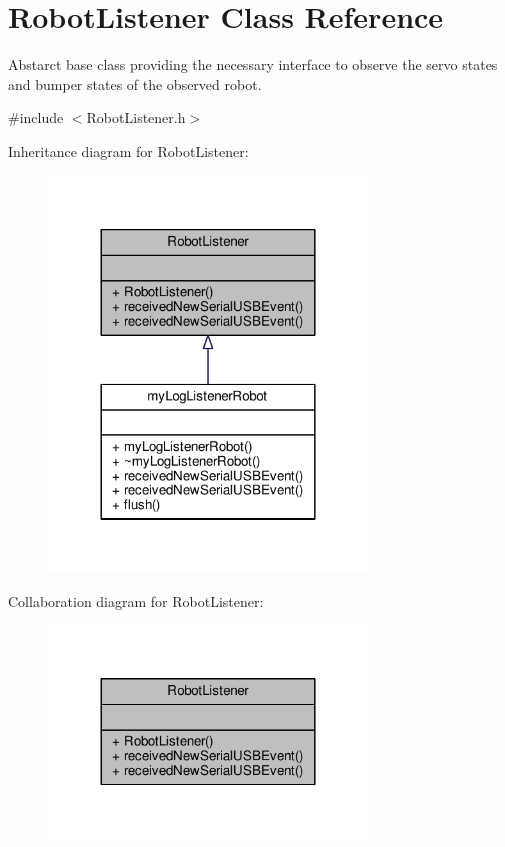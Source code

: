 \hypertarget{class_robot_listener}{}\section{Robot\+Listener Class Reference}
\label{class_robot_listener}


Abstarct base class providing the necessary interface to observe the servo states and bumper states of the observed robot.  




{\ttfamily \#include $<$Robot\+Listener.\+h$>$}



Inheritance diagram for Robot\+Listener\+:
\nopagebreak
\begin{figure}[H]
\begin{center}
\leavevmode
\includegraphics[width=240pt]{class_robot_listener__inherit__graph}
\end{center}
\end{figure}


Collaboration diagram for Robot\+Listener\+:
\nopagebreak
\begin{figure}[H]
\begin{center}
\leavevmode
\includegraphics[width=240pt]{class_robot_listener__coll__graph}
\end{center}
\end{figure}
